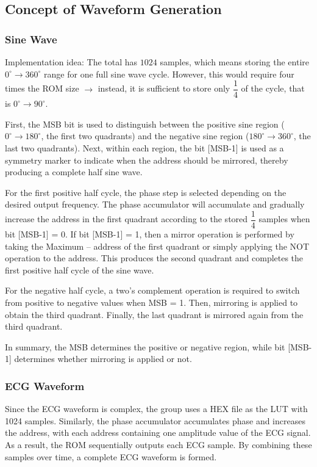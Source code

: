 \subsection{Concept of Waveform Generation}

\subsubsection{Sine Wave}

Implementation idea: The total has $1024$ samples, which means storing the entire $0^{\circ} \rightarrow 360^{\circ}$ range for one full sine wave cycle. However, this would require four times the ROM size $\rightarrow$ instead, it is sufficient to store only $\dfrac{1}{4}$ of the cycle, that is $0^{\circ} \rightarrow 90^{\circ}$.

First, the MSB bit is used to distinguish between the positive sine region ($0^{\circ} \rightarrow 180^{\circ}$, the first two quadrants) and the negative sine region ($180^{\circ} \rightarrow 360^{\circ}$, the last two quadrants). Next, within each region, the bit [MSB-1] is used as a symmetry marker to indicate when the address should be mirrored, thereby producing a complete half sine wave.

For the first positive half cycle, the phase step is selected depending on the desired output frequency. The phase accumulator will accumulate and gradually increase the address in the first quadrant according to the stored $\dfrac{1}{4}$ samples when bit [MSB-1] = 0. If bit [MSB-1] = 1, then a mirror operation is performed by taking the Maximum – address of the first quadrant or simply applying the NOT operation to the address. This produces the second quadrant and completes the first positive half cycle of the sine wave.

For the negative half cycle, a two’s complement operation is required to switch from positive to negative values when MSB = 1. Then, mirroring is applied to obtain the third quadrant. Finally, the last quadrant is mirrored again from the third quadrant.

In summary, the MSB determines the positive or negative region, while bit [MSB-1] determines whether mirroring is applied or not.

\subsubsection{ECG Waveform}

Since the ECG waveform is complex, the group uses a HEX file as the LUT with 1024 samples. Similarly, the phase accumulator accumulates phase and increases the address, with each address containing one amplitude value of the ECG signal. As a result, the ROM sequentially outputs each ECG sample. By combining these samples over time, a complete ECG waveform is formed.

